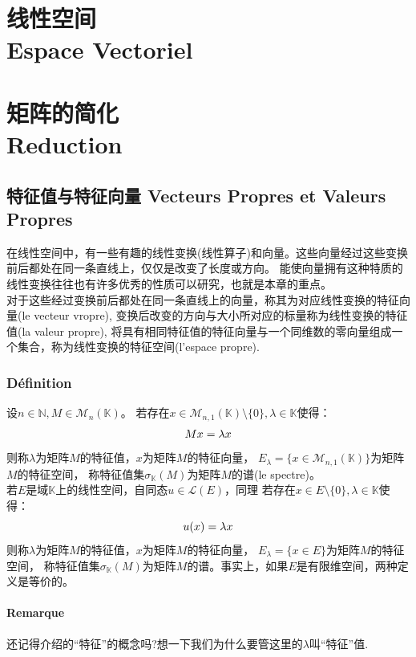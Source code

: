 \documentclass[12pt, a4paper, oneside]{ctexbook}
\begin{document}
\chapter{线性空间 \\Espace Vectoriel}
\chapter{矩阵的简化\\Reduction}

\section{特征值与特征向量 Vecteurs Propres et Valeurs Propres}
  在线性空间中，有一些有趣的线性变换(线性算子)和向量。这些向量经过这些变换前后都处在同一条直线上，仅仅是改变了长度或方向。
  能使向量拥有这种特质的线性变换往往也有许多优秀的性质可以研究，也就是本章的重点。\\
  
  对于这些经过变换前后都处在同一条直线上的向量，称其为对应线性变换的特征向量(le vecteur vropre),
  变换后改变的方向与大小所对应的标量称为线性变换的特征值(la valeur propre),
  将具有相同特征值的特征向量与一个同维数的零向量组成一个集合，称为线性变换的特征空间(l'espace propre).
  \subsection{Définition}
  设$n\in\mathbb{N} , M\in \mathcal{M}_n(\mathbb{K})$。
  若存在$x\in \mathcal{M}_{n,1}(\mathbb{K})\setminus\{0\}, \lambda\in\mathbb{K}$使得：
  \begin{equation}
    \notag
    Mx=\lambda x
  \end{equation}
  则称$\lambda$为矩阵$M$的特征值，$x$为矩阵$M$的特征向量，
  $E_\lambda=\{x\in\mathcal{M}_{n,1}(\mathbb{K})\}$为矩阵$M$的特征空间，
  称特征值集$\sigma_{\mathbb{K}}(M)$为矩阵$M$的谱(le spectre)。\\

  若$E$是域$\mathbb{K}$上的线性空间，自同态$u\in \mathcal{L} (E)$，同理
  若存在$x\in E\setminus\{0\}, \lambda\in\mathbb{K}$使得：
  \begin{equation}
    \notag
    u(x)=\lambda x
  \end{equation}
  则称$\lambda$为矩阵$M$的特征值，$x$为矩阵$M$的特征向量，
  $E_\lambda=\{x\in E\}$为矩阵$M$的特征空间，
  称特征值集$\sigma_{\mathbb{K}}(M)$为矩阵$M$的谱。事实上，如果$E$是有限维空间，两种定义是等价的。
  \subsubsection{Remarque}
  还记得介绍的“特征”的概念吗?想一下我们为什么要管这里的$\lambda$叫“特征”值.
\end{document}
